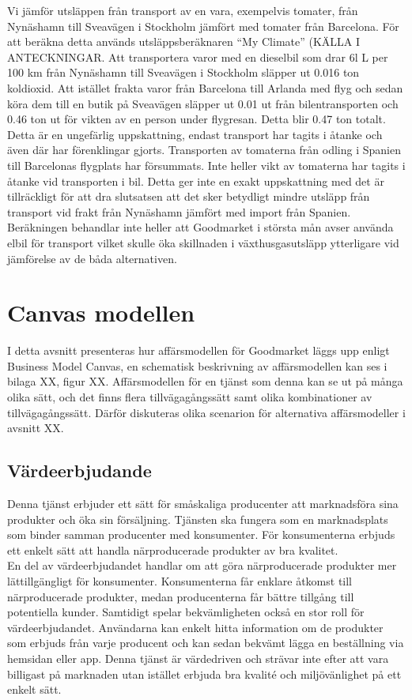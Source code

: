 \documentclass[10pt,a4paper,oneside]{article}
\begin{document}
Vi jämför utsläppen från transport av en vara, exempelvis tomater, från Nynäshamn till Sveavägen i Stockholm jämfört med tomater från Barcelona. För att beräkna detta används utsläppsberäknaren “My Climate” (KÄLLA I ANTECKNINGAR.  Att transportera varor med en dieselbil som drar 6l L per 100 km från Nynäshamn till Sveavägen i Stockholm släpper ut 0.016 ton koldioxid. Att istället frakta varor från Barcelona till Arlanda med flyg och sedan köra dem till en butik på Sveavägen släpper ut 0.01 ut från bilentransporten och 0.46 ton ut för vikten av en person under flygresan. Detta blir 0.47 ton totalt. Detta är en ungefärlig uppskattning, endast transport har tagits i åtanke och även där har förenklingar gjorts. Transporten av tomaterna från odling i Spanien till Barcelonas flygplats har försummats. Inte heller vikt av tomaterna har tagits i åtanke vid transporten i bil. Detta ger inte en exakt uppskattning med det är tillräckligt för att dra slutsatsen att det sker betydligt mindre utsläpp från transport vid frakt från Nynäshamn jämfört med import från Spanien. Beräkningen behandlar inte heller att Goodmarket i största mån avser använda elbil för transport vilket skulle öka skillnaden i växthusgasutsläpp ytterligare vid jämförelse av de båda alternativen.

\newpage

\section{Canvas modellen}
I detta avsnitt presenteras hur affärsmodellen för Goodmarket läggs upp enligt Business Model Canvas, en schematisk beskrivning av affärsmodellen kan ses i bilaga XX, figur XX. Affärsmodellen för en tjänst som denna kan se ut på många olika sätt, och det finns flera tillvägagångssätt samt olika kombinationer av tillvägagångssätt. Därför diskuteras olika scenarion för alternativa affärsmodeller i avsnitt XX. 

\subsection{Värdeerbjudande}
Denna tjänst erbjuder ett sätt för småskaliga producenter att marknadsföra sina produkter och öka sin försäljning. Tjänsten ska fungera som en marknadsplats som binder samman producenter med konsumenter. För konsumenterna erbjuds ett enkelt sätt att handla närproducerade produkter av bra kvalitet. \\

En del av värdeerbjudandet handlar om att göra närproducerade produkter mer lättillgängligt för konsumenter. Konsumenterna får enklare åtkomst till närproducerade produkter, medan producenterna får bättre tillgång till potentiella kunder. Samtidigt spelar bekvämligheten också en stor roll för värdeerbjudandet. Användarna kan enkelt hitta information om de produkter som erbjuds från varje producent och kan sedan bekvämt lägga en beställning via hemsidan eller app. Denna tjänst är värdedriven och strävar inte efter att vara billigast på marknaden utan istället erbjuda bra kvalité och miljövänlighet på ett enkelt sätt.  
\end{document}
